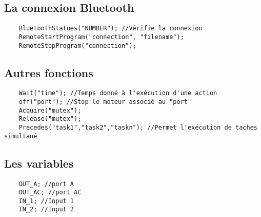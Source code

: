 \subsection{La connexion Bluetooth }
\begin{verbatim}
	BluetoothStatues("NUMBER"); //Vérifie la connexion
	RemoteStartProgram("connection", "filename");
	RemoteStopProgram("connection");

\end{verbatim}

\subsection{Autres fonctions }
\begin{verbatim}
	Wait("time"); //Temps donné à l'exécution d'une action
	off("port"); //Stop le moteur associé au "port"
	Acquire("mutex"); 
	Release("mutex"); 
	Precedes("task1","task2","taskn"); //Permet l'exécution de taches simultané

\end{verbatim}

\subsection{Les variables }
\begin{verbatim}
	OUT_A; //port A
	OUT_AC; //port AC
	IN_1; //Input 1
	IN_2; //Input 2

\end{verbatim}